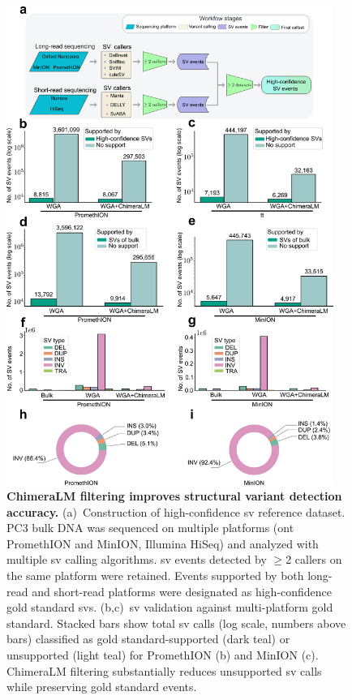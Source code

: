 \documentclass[pdflatex,sn-nature,lineno]{sn-jnl}%
\theoremstyle{thmstyleone}%
\theoremstyle{thmstyletwo}%
\theoremstyle{thmstylethree}%
\begin{document}
\begin{figure}[H]
	\begin{center}
		\includegraphics[width=0.95\textwidth]{final_figures/figure3}
	\end{center}
	\caption{{\bf ChimeraLM filtering improves structural variant detection accuracy.}
		(a)~Construction of high-confidence \gls{sv} reference dataset. PC3 bulk DNA was sequenced on multiple platforms (\gls{ont} PromethION and MinION, Illumina HiSeq) and analyzed with multiple \gls{sv} calling algorithms. \gls{sv} events detected by $\geq$2 callers on the same platform were retained. Events supported by both long-read and short-read platforms were designated as high-confidence gold standard \glspl{sv}.
		(b,c)~\gls{sv} validation against multi-platform gold standard. Stacked bars show total \gls{sv} calls (log scale, numbers above bars) classified as gold standard-supported (dark teal) or unsupported (light teal) for PromethION (b) and MinION (c). ChimeraLM filtering substantially reduces unsupported \gls{sv} calls while preserving gold standard events.
}
\end{figure}
\end{document}
